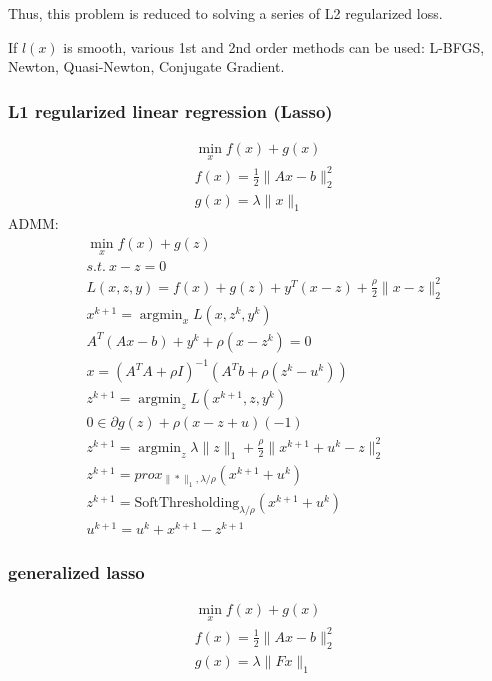 \documentclass[8pt]{extarticle}
\DeclareMathOperator*{\argmin}{argmin}
\newcommand{\norm}[1]{\|#1\|}
\begin{document}
\begin{multicols*}{2}
  Thus, this problem is reduced to solving a series of L2 regularized loss.

  If $l(x)$ is smooth, various 1st and 2nd order methods can be used: L-BFGS, Newton, Quasi-Newton, Conjugate Gradient.

  \vfill\null
  \columnbreak
  
  \subsubsection{L1 regularized linear regression (Lasso)}
  \begin{align*}
    &\min_x f(x) + g(x)\\
    &f(x) = \frac{1}{2}\norm{Ax-b}_2^2\\
    &g(x)=\lambda\norm{x}_1
  \end{align*}
  ADMM:
  \begin{align*}
    &\min_x f(x) + g(z)\\
    &s.t.\ x-z=0\\
    &L(x,z,y)=f(x) + g(z) + y^T(x-z) + \frac{\rho}{2}\norm{x-z}_2^2\\
    &x^{k+1} = \argmin_x L(x,z^k,y^k)\\
    &A^T(Ax-b) + y^k + \rho (x-z^k)=0\\
    &x = (A^TA+\rho I)^{-1}(A^Tb + \rho (z^k-u^k))\\
    &z^{k+1} = \argmin_z L(x^{k+1},z,y^k)\\
    &0 \in \partial g(z) +\rho(x-z+u)(-1)\\
    &z^{k+1} = \argmin_z \lambda\norm{z}_1 + \frac{\rho}{2}\norm{x^{k+1}+u^k-z}_2^2\\
    &z^{k+1} = prox_{\norm{*}_1, \lambda/\rho}(x^{k+1}+u^k)\\
    &z^{k+1} = \text{SoftThresholding}_{\lambda/\rho}(x^{k+1}+u^k)\\
    &u^{k+1} = u^k+x^{k+1}-z^{k+1}
  \end{align*}  

  \vfill\null
  \columnbreak
  
  \subsubsection{generalized lasso}
  \begin{align*}
    &\min_x f(x) + g(x)\\
    &f(x) = \frac{1}{2}\norm{Ax-b}_2^2\\
    &g(x)=\lambda\norm{Fx}_1
  \end{align*}
  

\end{multicols*}
\end{document}
